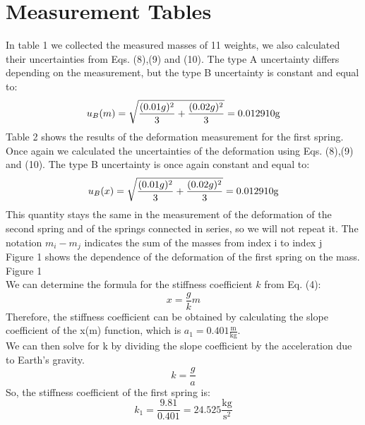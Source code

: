 \documentclass{article}
\begin{document}
\section{Measurement Tables}
In table 1 we collected the measured masses of 11 weights, we also calculated their uncertainties from Eqs. (8),(9) and (10). The type A uncertainty differs depending on the measurement, but the type B uncertainty is constant and equal to: \\
\begin{equation}
    u_B(m) = \sqrt{\frac{(0.01 g)^2}{3} + \frac{(0.02 g)^2}{3}} = 0.012910 \mathrm{g} \\
\end{equation}
Table 2 shows the results of the deformation measurement for the first spring. Once again we calculated the uncertainties of the deformation using Eqs. (8),(9) and (10). The type B uncertainty is once again constant and equal to: \\
\begin{equation}
    u_B(x) = \sqrt{\frac{(0.01 g)^2}{3} + \frac{(0.02 g)^2}{3}} = 0.012910 \mathrm{g} \\
\end{equation}
This quantity stays the same in the measurement of the deformation of the second spring and of the springs connected in series, so we will not repeat it. The notation \(m_i - m_j\) indicates the sum of the masses from index i to index j \\ 

Figure 1 shows the dependence of the deformation of the first spring on the mass. \\
Figure 1 \\
We can determine the formula for the stiffness coefficient \(k\) from Eq. (4):
\begin{equation}
    x = \frac{g}{k}m
\end{equation}
Therefore, the stiffness coefficient can be obtained by calculating the slope coefficient of the x(m) function, which is \(a_1 = 0.401 \mathrm{\frac{m}{kg}}\). \\
We can then solve for k by dividing the slope coefficient by the acceleration due to Earth's gravity. \\
\begin{equation}
    k = \frac{g}{a}
\end{equation}
So, the stiffness coefficient of the first spring is: 
\begin{equation}
    k_1 = \frac{9.81}{0.401} = 24.525 \mathrm{\frac{kg}{s^2}}
\end{equation}
\end{document}
